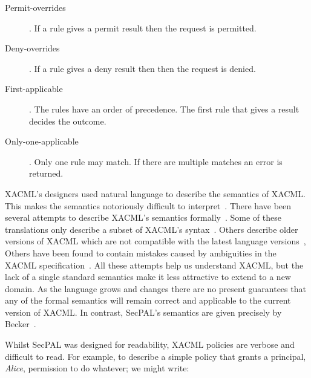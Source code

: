 \documentclass[thesis.tex]{subfiles}
\begin{document}
\begin{description}
  \item[Permit-overrides]. If a rule gives a permit result then the request is permitted.
  \item[Deny-overrides]. If a rule gives a deny result then then the request is denied.
  \item[First-applicable]. The rules have an order of precedence. The first rule that gives a result decides the outcome.
  \item[Only-one-applicable]. Only one rule may match. If there are multiple matches an error is returned.
\end{description}

XACML's designers used natural language to describe the semantics of XACML. This
makes the semantics notoriously difficult to
interpret~\cite{ramli_detecting_2015}. There have been several attempts to
describe XACML's semantics
formally~\cite{ramli_xacml_2012,ramli_logic_2014,bryans_reasoning_2005}. Some of
these translations only describe a subset of XACML's
syntax~\cite{halpern_using_2008}. Others describe older versions of XACML which
are not compatible with the latest language versions~\cite{ahn_reasoning_2010},
Others have been found to contain mistakes caused by ambiguities in the
XACML specification~\cite{bruns_access-control_2008,halpern_using_2008}. All
these attempts help us understand XACML, but the lack of a single standard
semantics make it less attractive to extend to a new domain. As the language
grows and changes there are no present guarantees that any of the formal
semantics will remain correct and applicable to the current version of XACML. In
contrast, SecPAL's semantics are given precisely by
Becker~\cite{becker_secpal:_2006}.

Whilst SecPAL was designed for readability, XACML policies are verbose and
difficult to read. For example, to describe a simple policy that grants a principal,
\emph{Alice}, permission to do whatever; we might write:
\end{document}
